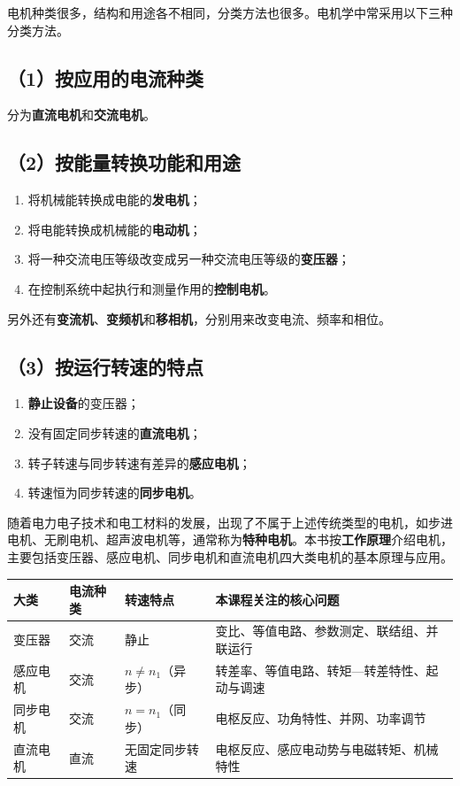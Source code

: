 电机种类很多，结构和用途各不相同，分类方法也很多。电机学中常采用以下三种分类方法。

\subsection*{（1）按应用的电流种类}
分为\textbf{直流电机}和\textbf{交流电机}。

\subsection*{（2）按能量转换功能和用途}
\begin{enumerate}
  \item 将机械能转换成电能的\textbf{发电机}；
  \item 将电能转换成机械能的\textbf{电动机}；
  \item 将一种交流电压等级改变成另一种交流电压等级的\textbf{变压器}；
  \item 在控制系统中起执行和测量作用的\textbf{控制电机}。
\end{enumerate}
另外还有\textbf{变流机}、\textbf{变频机}和\textbf{移相机}，分别用来改变电流、频率和相位。

\subsection*{（3）按运行转速的特点}
\begin{enumerate}
  \item \textbf{静止设备}的变压器；
  \item 没有固定同步转速的\textbf{直流电机}；
  \item 转子转速与同步转速有差异的\textbf{感应电机}；
  \item 转速恒为同步转速的\textbf{同步电机}。
\end{enumerate}

随着电力电子技术和电工材料的发展，出现了不属于上述传统类型的电机，如步进电机、无刷电机、超声波电机等，通常称为\textbf{特种电机}。本书按\textbf{工作原理}介绍电机，主要包括变压器、感应电机、同步电机和直流电机四大类电机的基本原理与应用。

\begin{center}
\begin{tabular}{@{}p{2.4cm}p{2.2cm}p{2.6cm}p{5.0cm}@{}}
\toprule
大类 & 电流种类 & 转速特点 & 本课程关注的核心问题 \\
\midrule
变压器 & 交流 & 静止 & 变比、等值电路、参数测定、联结组、并联运行 \\
感应电机 & 交流 & $n \neq n_1$（异步） & 转差率、等值电路、转矩—转差特性、起动与调速 \\
同步电机 & 交流 & $n = n_1$（同步） & 电枢反应、功角特性、并网、功率调节 \\
直流电机 & 直流 & 无固定同步转速 & 电枢反应、感应电动势与电磁转矩、机械特性 \\
\bottomrule
\end{tabular}
\end{center}

